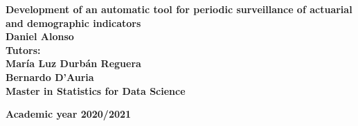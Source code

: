 \documentclass[a4paper,12pt]{article}
\begin{document}
	\begin{titlepage}
	\begin{center}
	\linespread{2}\selectfont\bfseries{\LARGE Development of an automatic tool for periodic surveillance of actuarial and demographic indicators}
	\\[5 cm]
	\textbf{\large Daniel Alonso}\\[0.6cm]
	\textbf{Tutors:}\\[0.01cm]
	\textbf{\large María Luz Durbán Reguera \\ Bernardo D'Auria}\\[0.7 cm]
	\textbf{\large Master in Statistics for Data Science}\\[0.3 cm]
	\begin{figure}[H]
		\centering
	\end{figure}
	\textbf{\large Academic year 2020/2021}    
	\end{center}
	\end{titlepage} 
\end{document}
